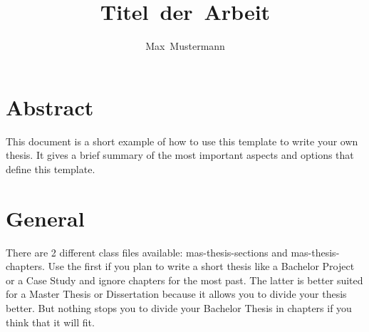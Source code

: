 \documentclass[masterthesis, english]{mas-thesis-chapters} %
\author{Max~Mustermann}						%
\title{Titel~der~Arbeit}
\begin{document}
\maketitle				%

%
%
\makelicensepageCCBYSA


\cleardoublepage
{}
%
\tableofcontents		%
\newpage
\listofillustrations	%


\cleardoublepage

\newpage
\begingroup %
	\let\clearpage\relax
	\printglossaries
\endgroup



\chapter*{Abstract}
{}%

This document is a short example of how to use this template to write your own thesis. It gives a brief summary of the most important aspects and options that define this template.


\cleardoublepage
{}
\setcounter{page}{1}


\chapter{General}

There are 2 different class files available: mas-thesis-sections and mas-thesis-chapters. Use the first if you plan to write a short thesis like a Bachelor Project or a Case Study and ignore chapters for the most past. The latter is better suited for a Master Thesis or Dissertation because it allows you to divide your thesis better. But nothing stops you to divide your Bachelor Thesis in chapters if you think that it will fit.
\end{document}
